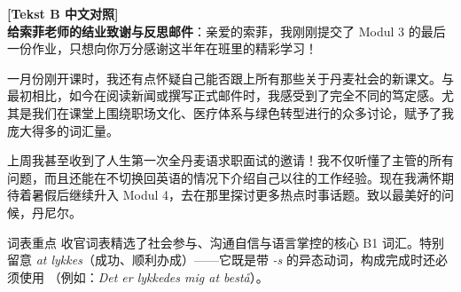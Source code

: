 \begin{transbox}
\small
\textbf{\color{NCDTeal}[Tekst B 中文对照]}\\
\textbf{给索菲老师的结业致谢与反思邮件}：亲爱的索菲，我刚刚提交了 Modul 3 的最后一份作业，只想向你万分感谢这半年在班里的精彩学习！

一月份刚开课时，我还有点怀疑自己能否跟上所有那些关于丹麦社会的新课文。与最初相比，如今在阅读新闻或撰写正式邮件时，我感受到了完全不同的笃定感。尤其是我们在课堂上围绕职场文化、医疗体系与绿色转型进行的众多讨论，赋予了我庞大得多的词汇量。

上周我甚至收到了人生第一次全丹麦语求职面试的邀请！我不仅听懂了主管的所有问题，而且还能在不切换回英语的情况下介绍自己以往的工作经验。现在我满怀期待着暑假后继续升入 Modul 4，去在那里探讨更多热点时事话题。致以最美好的问候，丹尼尔。
\end{transbox}


\begin{tipbox}{词表重点}
收官词表精选了社会参与、沟通自信与语言掌控的核心 B1 词汇。特别留意 \textit{at lykkes}（成功、顺利办成）——它既是带 \textit{-s} 的异态动词，构成完成时还必须使用 （例如：\textit{Det er lykkedes mig at bestå}）。
\end{tipbox}

